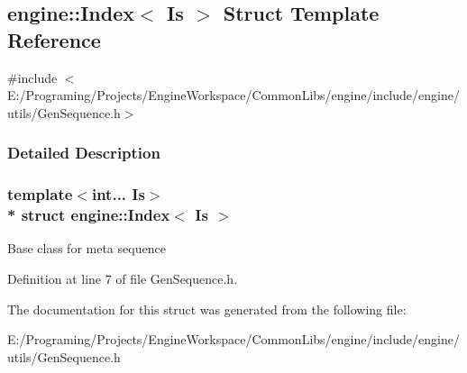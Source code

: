 \hypertarget{a00047}{}\subsection{engine\+:\+:Index$<$ Is $>$ Struct Template Reference}
\label{a00047}


{\ttfamily \#include $<$E\+:/\+Programing/\+Projects/\+Engine\+Workspace/\+Common\+Libs/engine/include/engine/utils/\+Gen\+Sequence.\+h$>$}



\subsubsection{Detailed Description}
\subsubsection*{template$<$int... Is$>$\\*
struct engine\+::\+Index$<$ Is $>$}

Base class for meta sequence 

Definition at line 7 of file Gen\+Sequence.\+h.



The documentation for this struct was generated from the following file\+:\begin{DoxyCompactItemize}
\item 
E\+:/\+Programing/\+Projects/\+Engine\+Workspace/\+Common\+Libs/engine/include/engine/utils/Gen\+Sequence.\+h\end{DoxyCompactItemize}
